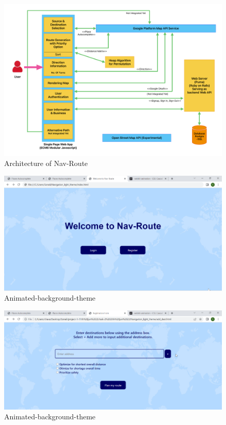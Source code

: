 \documentclass{article}
\begin{document}
\begin{figure}
  \centering
  \includegraphics[width=1\textwidth]{NithishFinal/Architecture_v2.pdf}
  \caption{Architecture of Nav-Route}
  \label{fig:example}
\end{figure}


\begin{figure}
  \centering
  \includegraphics[width=1\textwidth]{NithishFinal/Picture5.png}
  \caption{Animated-background-theme }
  \label{fig:example}
\end{figure}

\begin{figure}
  \centering
  \includegraphics[width=1\textwidth]{NithishFinal/Picture6.png}
  \caption{Animated-background-theme }
  \label{fig:example}
\end{figure}
\end{document}
